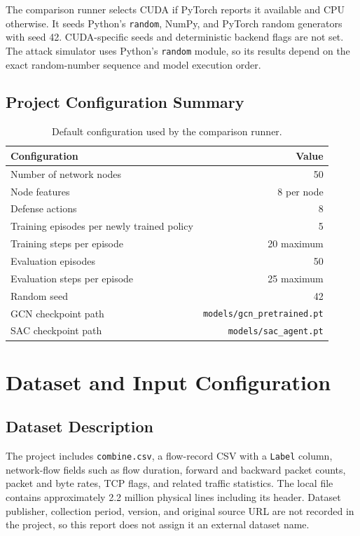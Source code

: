 \documentclass[12pt,a4paper]{report}
\newcommand{\code}[1]{\texttt{#1}}
\begin{document}
The comparison runner selects CUDA if PyTorch reports it available and CPU otherwise. It seeds Python's \code{random}, NumPy, and PyTorch random generators with seed 42. CUDA-specific seeds and deterministic backend flags are not set. The attack simulator uses Python's \code{random} module, so its results depend on the exact random-number sequence and model execution order.

\subsection{Project Configuration Summary}

\begin{table}[htbp]
\centering
\caption{Default configuration used by the comparison runner.}
\begin{tabular}{lr}
\toprule
\textbf{Configuration} & \textbf{Value} \\
\midrule
Number of network nodes & 50 \\
Node features & 8 per node \\
Defense actions & 8 \\
Training episodes per newly trained policy & 5 \\
Training steps per episode & 20 maximum \\
Evaluation episodes & 50 \\
Evaluation steps per episode & 25 maximum \\
Random seed & 42 \\
GCN checkpoint path & \code{models/gcn\_pretrained.pt} \\
SAC checkpoint path & \code{models/sac\_agent.pt} \\
\bottomrule
\end{tabular}
\end{table}

\section{Dataset and Input Configuration}

\subsection{Dataset Description}

The project includes \code{combine.csv}, a flow-record CSV with a \code{Label} column, network-flow fields such as flow duration, forward and backward packet counts, packet and byte rates, TCP flags, and related traffic statistics. The local file contains approximately 2.2 million physical lines including its header. Dataset publisher, collection period, version, and original source URL are not recorded in the project, so this report does not assign it an external dataset name.
\end{document}
